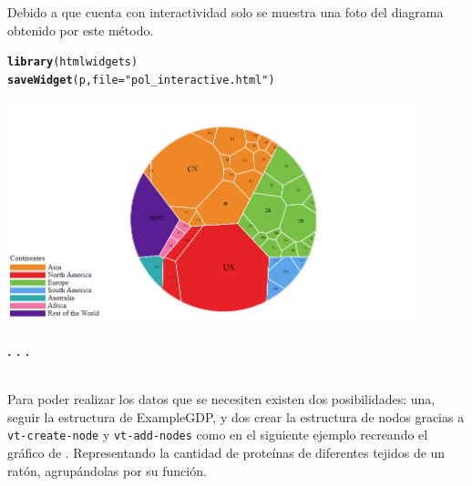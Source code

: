 \documentclass{article}\usepackage[]{graphicx}\usepackage[]{color}
\makeatletter
\newcommand{\hlstr}[1]{\textcolor[rgb]{0.192,0.494,0.8}{#1}}%
\newcommand{\hlstd}[1]{\textcolor[rgb]{0.345,0.345,0.345}{#1}}%
\newcommand{\hlkwc}[1]{\textcolor[rgb]{0.333,0.667,0.333}{#1}}%
\newcommand{\hlkwd}[1]{\textcolor[rgb]{0.737,0.353,0.396}{\textbf{#1}}}%
\newenvironment{kframe}{%
 \def\at@end@of@kframe{}%
 \ifinner\ifhmode%
  \def\at@end@of@kframe{\end{minipage}}%
  \begin{minipage}{\columnwidth}%
 \fi\fi%
 \def\FrameCommand##1{\hskip\@totalleftmargin \hskip-\fboxsep
 \colorbox{shadecolor}{##1}\hskip-\fboxsep
     \hskip-\linewidth \hskip-\@totalleftmargin \hskip\columnwidth}%
 \MakeFramed {\advance\hsize-\width
   \@totalleftmargin\z@ \linewidth\hsize
   \@setminipage}}%
 {\par\unskip\endMakeFramed%
 \at@end@of@kframe}
\newenvironment{knitrout}{}{} %
\makeatother
\begin{document}
Debido a que cuenta con interactividad solo se muestra una foto del diagrama obtenido por este m\'etodo.
\begin{knitrout}
\color{fgcolor}\begin{kframe}
\begin{alltt}
\hlkwd{library}\hlstd{(htmlwidgets)}
\hlkwd{saveWidget}\hlstd{(p,}\hlkwc{file}\hlstd{=}\hlstr{"pol_interactive.html"}\hlstd{)}
\end{alltt}
\end{kframe}
\end{knitrout}
\vbox{
    \centering
    \includegraphics[width=0.9\textwidth]{imag/pol_interactive}
}
\begin{center}
\textbf{. . .}
\end{center}
~\\
Para poder realizar los datos que se necesiten existen dos posibilidades: una, seguir la estructura de ExampleGDP, y dos crear la estructura de nodos gracias a \texttt{vt-create-node} y \texttt{vt-add-nodes} como en el siguiente ejemplo recreando el gr\'afico de \cite[p\'ag 194]{Circle}. Representando la cantidad de prote\'inas de diferentes tejidos de un rat\'on, agrup\'andolas por su funci\'on.
\end{document}
